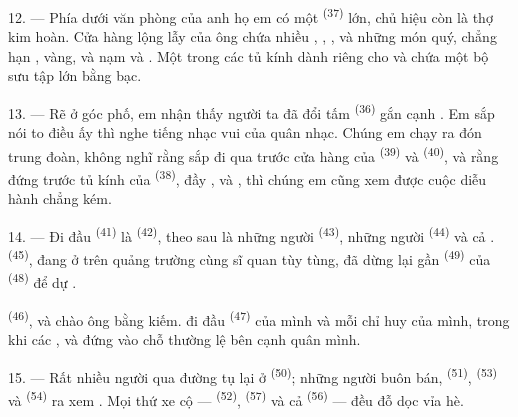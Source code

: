 12. --- Phía dưới văn phòng của anh họ em có một 
\textsuperscript{(37)} lớn, chủ hiệu còn là thợ kim hoàn. Cửa hàng lộng lẫy của ông chứa
nhiều , , ,
 và những món  quý, chẳng hạn ,  vàng,  và  nạm  và
. Một trong các tủ kính dành riêng cho  và chứa
một bộ sưu tập lớn  bằng bạc.

13. --- Rẽ ở góc phố, em nhận thấy người ta đã đổi tấm 
\textsuperscript{(36)} gắn cạnh . Em sắp nói to điều ấy thì nghe tiếng
nhạc vui của  quân nhạc. Chúng em chạy ra đón trung đoàn, không nghĩ rằng
 sắp đi qua trước cửa hàng của  \textsuperscript{(39)} và
 \textsuperscript{(40)}, và rằng đứng trước tủ kính của
 \textsuperscript{(38)}, đầy ,
 và , thì chúng em cũng xem được cuộc diễu hành chẳng
kém.

\VUsaut{3.0mm}

14. --- Đi đầu  \textsuperscript{(41)} là  \textsuperscript{(42)}, theo sau là những người 
\textsuperscript{(43)}, những người  \textsuperscript{(44)} và cả
.  \textsuperscript{(45)}, đang ở trên quảng
trường cùng sĩ quan tùy tùng, đã dừng lại gần 
\textsuperscript{(49)} của  \textsuperscript{(48)} để dự .

 \textsuperscript{(46)},  và
 chào ông bằng kiếm.  đi đầu  \textsuperscript{(47)} của mình và mỗi  chỉ huy  của
mình, trong khi các ,  và  đứng vào
chỗ thường lệ bên cạnh quân mình.

15. --- Rất nhiều người qua đường tụ lại ở  \textsuperscript{(50)}; những
người buôn bán,  \textsuperscript{(51)}, 
\textsuperscript{(53)} và  \textsuperscript{(54)} ra xem
. Mọi thứ xe cộ —  \textsuperscript{(52)},  \textsuperscript{(57)} và cả  \textsuperscript{(56)} —
đều đỗ dọc vỉa hè.

